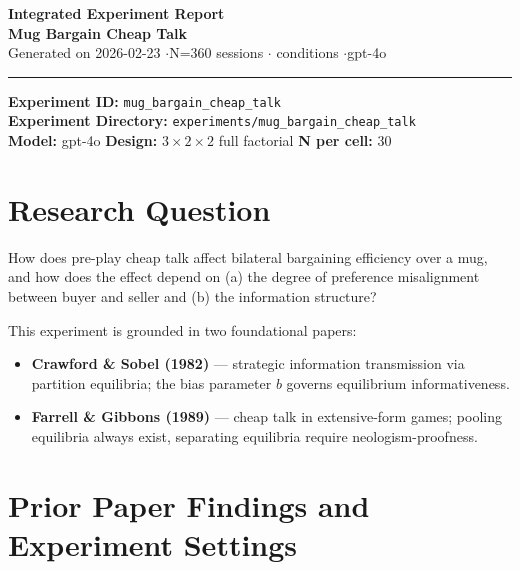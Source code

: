 \documentclass[11pt]{article}
\begin{document}
\begin{center}
{\LARGE \textbf{\textcolor{TitleBlue}{Integrated Experiment Report}}}\\[0.25em]
{\Large \textbf{Mug Bargain Cheap Talk}}\\[0.45em]
{\color{MetaGray} Generated on 2026-02-23 \quad$\cdot$\quad N=360 sessions \quad$\cdot$ conditions \quad$\cdot$\quad gpt-4o}
\end{center}
\vspace{0.4em}
\hrule
\vspace{0.7em}
\textbf{Experiment ID:} \texttt{mug\_bargain\_cheap\_talk}\\
\textbf{Experiment Directory:} \texttt{experiments/mug\_bargain\_cheap\_talk}\\
\textbf{Model:} gpt-4o \quad \textbf{Design:} $3 \times 2 \times 2$ full factorial \quad \textbf{N per cell:} 30
\vspace{0.6em}

\section{Research Question}

How does pre-play cheap talk affect bilateral bargaining efficiency over a mug, and how does the effect depend on (a) the degree of preference misalignment between buyer and seller and (b) the information structure?

This experiment is grounded in two foundational papers:
\begin{itemize}
\item \textbf{Crawford \& Sobel (1982)} --- strategic information transmission via partition equilibria; the bias parameter $b$ governs equilibrium informativeness.
\item \textbf{Farrell \& Gibbons (1989)} --- cheap talk in extensive-form games; pooling equilibria always exist, separating equilibria require neologism-proofness.
\end{itemize}

\section{Prior Paper Findings and Experiment Settings}
\end{document}
